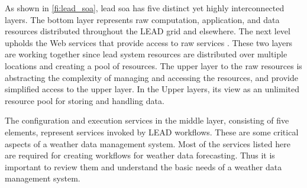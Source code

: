As shown in \cref{fi:lead_soa}, \acrshort{lead} \acrshort{soa} has five distinct yet highly interconnected layers. 
The bottom layer represents raw computation, application, and data resources distributed throughout the LEAD grid and elsewhere. The next level upholds the Web services that provide access to raw services \cite{Droegemeier2005Service-OrientedWeather}. These two layers are working together since \acrshort{lead} system resources are distributed over multiple locations and creating a pool of resources. The upper layer to the raw resources is abstracting the complexity of managing and accessing the resources, and provide simplified access to the upper layer. In the Upper layers, its view as an unlimited resource pool for storing and handling data.

The configuration and execution services in the middle layer, consisting of five elements, represent services invoked by LEAD workflows. These are some critical aspects of a weather data management system. Most of the services listed here are required for creating workflows for weather data forecasting. Thus it is important to review them and understand the basic needs of a weather data management system.

